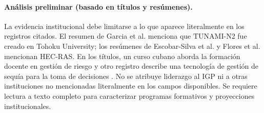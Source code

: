 \documentclass[12pt,a4paper]{article}
\begin{document}
\paragraph*{Análisis preliminar (basado en títulos y resúmenes).}
La evidencia institucional debe limitarse a lo que aparece literalmente en los registros citados. El resumen de Garcia et al. menciona que TUNAMI-N2 fue creado en Tohoku University; los resúmenes de Escobar-Silva et al. y Flores et al. mencionan HEC-RAS. En los títulos, un curso cubano aborda la formación docente en gestión de riesgo y otro registro describe una tecnología de gestión de sequía para la toma de decisiones \parencite{garcia2025parallel, escobarsilva2023assessing, flores2026numerical, lengonzlez2022curso, varelaledesma2021tecnolog}. No se atribuye liderazgo al IGP ni a otras instituciones no mencionadas literalmente en los campos disponibles. Se requiere lectura a texto completo para caracterizar programas formativos y proyecciones institucionales.

\end{document}
